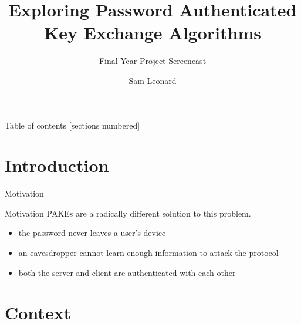\documentclass[hyperref={pdfpagemode=FullScreen}, aspectratio=169, 10pt]{beamer}
\title{Exploring Password Authenticated Key Exchange Algorithms}
\subtitle{Final Year Project Screencast}
\author{Sam Leonard}
\institute{Supervisor: Bernardo Magri}
\date{}
\newcommand{\cmark}{\ding{51}}%
\begin{document}
\maketitle

\begin{frame}{Table of contents}
  [sections numbered]
  \tableofcontents%
\end{frame}

\section[Intro]{Introduction}

\begin{frame}{Motivation}
  \begin{figure}[H]
    \centering
  \end{figure}
\end{frame}

\begin{frame}{Motivation}
  PAKEs are a radically different solution to this problem.
  \begin{itemize}
    \item{the password never leaves a user's device}
    \item{an eavesdropper cannot learn enough information to attack the protocol}
    \item{both the server and client are authenticated with each other}
  \end{itemize}
\end{frame}

\section{Context}
\end{document}
